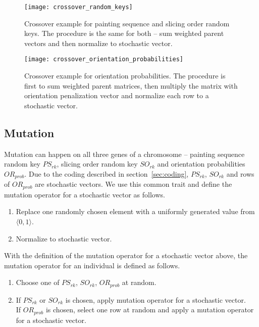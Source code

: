\begin{figure}[!htp]
    \texttt{[image: crossover\_random\_keys]}\caption{
        Crossover example for painting sequence and slicing order random keys.
        The procedure is the same for both – sum weighted parent vectors and then normalize to stochastic vector.
    }
    \label{fig:crossover-random-keys}
\end{figure}

\begin{figure}[!htp]
    \texttt{[image: crossover\_orientation\_probabilities]}\caption{
        Crossover example for orientation probabilities. The procedure is first to sum weighted parent matrices,
        then multiply the matrix with orientation penalization vector and normalize each row to a stochastic vector.}
    \label{fig:crossover-orientation-probabilities}
\end{figure}

\subsection{Mutation}\label{subsec:mutation}

Mutation can happen on all three genes of a chromosome – painting sequence random key $PS_{rk}$,
slicing order random key $SO_{rk}$ and orientation probabilities $OR_{prob}$.
Due to the coding described in section~\ref{sec:coding}, $PS_{rk}$, $SO_{rk}$ and rows of $OR_{prob}$ are stochastic vectors.
We use this common trait and define the mutation operator for a stochastic vector as follows.

\begin{enumerate}
    \item Replace one randomly chosen element with a uniformly generated value from $\langle 0,1 \rangle$.
    \item Normalize to stochastic vector.
\end{enumerate}

With the definition of the mutation operator for a stochastic vector above, the mutation operator for an individual is defined as follows.

\begin{enumerate}
    \item Choose one of $PS_{rk}$, $SO_{rk}$, $OR_{prob}$ at random.
    \item If $PS_{rk}$ or $SO_{rk}$ is chosen, apply mutation operator for a stochastic vector.\\
    If $OR_{prob}$ is chosen, select one row at random and apply a mutation operator for a stochastic vector.
\end{enumerate}

